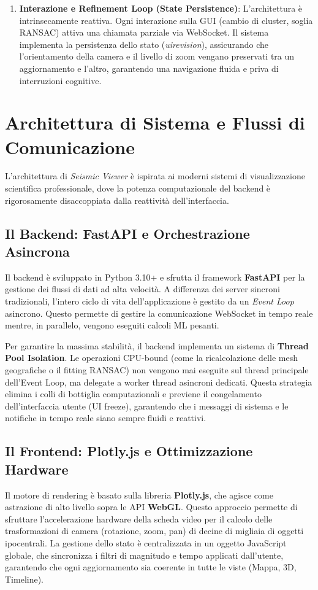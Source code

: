 \documentclass[12pt,a4paper]{article}
\begin{document}
\begin{enumerate}
    \item \textbf{Interazione e Refinement Loop (State Persistence)}: L'architettura è intrinsecamente reattiva. Ogni interazione sulla GUI (cambio di cluster, soglia RANSAC) attiva una chiamata parziale via WebSocket. Il sistema implementa la persistenza dello stato (\textit{uirevision}), assicurando che l'orientamento della camera e il livello di zoom vengano preservati tra un aggiornamento e l'altro, garantendo una navigazione fluida e priva di interruzioni cognitive.
\end{enumerate}

\section{Architettura di Sistema e Flussi di Comunicazione}
L'architettura di \textit{Seismic Viewer} è ispirata ai moderni sistemi di visualizzazione scientifica professionale, dove la potenza computazionale del backend è rigorosamente disaccoppiata dalla reattività dell'interfaccia.

\subsection{Il Backend: FastAPI e Orchestrazione Asincrona}
Il backend è sviluppato in Python 3.10+ e sfrutta il framework \textbf{FastAPI} per la gestione dei flussi di dati ad alta velocità. A differenza dei server sincroni tradizionali, l'intero ciclo di vita dell'applicazione è gestito da un \textit{Event Loop} asincrono. Questo permette di gestire la comunicazione WebSocket in tempo reale mentre, in parallelo, vengono eseguiti calcoli ML pesanti.

Per garantire la massima stabilità, il backend implementa un sistema di \textbf{Thread Pool Isolation}. Le operazioni CPU-bound (come la ricalcolazione delle mesh geografiche o il fitting RANSAC) non vengono mai eseguite sul thread principale dell'Event Loop, ma delegate a worker thread asincroni dedicati. Questa strategia elimina i colli di bottiglia computazionali e previene il congelamento dell'interfaccia utente (UI freeze), garantendo che i messaggi di sistema e le notifiche in tempo reale siano sempre fluidi e reattivi.

\subsection{Il Frontend: Plotly.js e Ottimizzazione Hardware}
Il motore di rendering è basato sulla libreria \textbf{Plotly.js}, che agisce come astrazione di alto livello sopra le API \textbf{WebGL}. Questo approccio permette di sfruttare l'accelerazione hardware della scheda video per il calcolo delle trasformazioni di camera (rotazione, zoom, pan) di decine di migliaia di oggetti ipocentrali. La gestione dello stato è centralizzata in un oggetto JavaScript globale, che sincronizza i filtri di magnitudo e tempo applicati dall'utente, garantendo che ogni aggiornamento sia coerente in tutte le viste (Mappa, 3D, Timeline).
\end{document}
